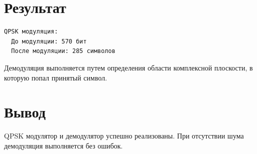 \section{Результат}
\begin{verbatim}
QPSK модуляция:
  До модуляции: 570 бит
  После модуляции: 285 символов
\end{verbatim}
Демодуляция выполняется путем определения области комплексной плоскости, в которую попал принятый символ.

\section{Вывод}
QPSK модулятор и демодулятор успешно реализованы. При отсутствии шума демодуляция выполняется без ошибок.